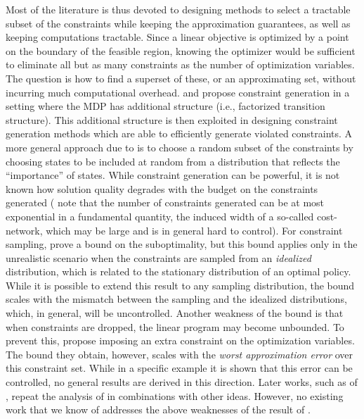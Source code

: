 \documentclass[twocolumn]{IEEEtran}
\begin{document}
Most of the literature is thus devoted to designing methods to select a tractable subset of the constraints while keeping the approximation guarantees, as well as keeping computations tractable.
Since a linear objective is optimized by a point on the boundary of the feasible region,
knowing the optimizer would be sufficient to eliminate all but
as many constraints as the number of optimization variables.
The question is how to find a superset of these, or an approximating set, without incurring much computational overhead.
\citet{schuurmans} and \citet{gkp} propose constraint generation in a setting
where the MDP has additional structure (i.e., factorized transition structure).
This additional structure is then exploited in designing constraint generation methods which are able to efficiently generate
violated constraints. A more general approach due to \citet{CS}
is to choose a random subset of the constraints
by choosing states to be included at random from a distribution that reflects the ``importance'' of states.
While constraint generation can be powerful,
it is not known how solution quality degrades with the budget on the constraints generated
(\citeauthor{gkp} note that the number of constraints generated can be at most exponential in a fundamental quantity,
the induced width of a so-called cost-network, which may be large and is in general hard to control).
For constraint sampling,  \citet{CS} prove a bound on the suboptimality, but this bound applies only
in the unrealistic scenario when the constraints are sampled from an \emph{idealized} distribution,
which is related to the stationary distribution of an optimal policy.
While it is possible to extend this result
to any sampling distribution, the bound scales with the mismatch between the sampling and the idealized
distributions, which, in general, will be uncontrolled.
Another weakness of the bound is that when constraints are dropped, the linear program may become
unbounded. To prevent this, \citet{CS}  propose imposing an extra constraint on the optimization variables.
The bound they obtain, however, scales with the \emph{worst approximation error} over this constraint set.
While in a specific example it is shown that this error can be controlled, no general results are derived in this direction.
Later works, such as of
\citet{SALP,BhatFaMo12:SALPNP},  repeat the analysis of \citet{CS}
in combinations with other ideas. However, no existing work that we know of addresses the above weaknesses of the result of \citet{CS}.
\end{document}
